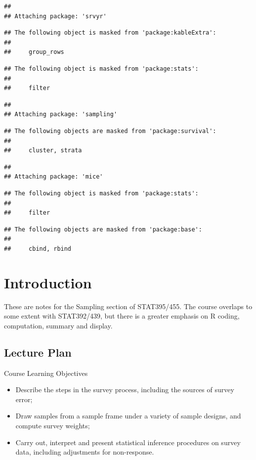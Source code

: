\documentclass[
]{book}
\providecommand{\tightlist}{%
  \setlength{\itemsep}{0pt}\setlength{\parskip}{0pt}}
\begin{document}
\begin{verbatim}
## 
## Attaching package: 'srvyr'
\end{verbatim}

\begin{verbatim}
## The following object is masked from 'package:kableExtra':
## 
##     group_rows
\end{verbatim}

\begin{verbatim}
## The following object is masked from 'package:stats':
## 
##     filter
\end{verbatim}

\begin{verbatim}
## 
## Attaching package: 'sampling'
\end{verbatim}

\begin{verbatim}
## The following objects are masked from 'package:survival':
## 
##     cluster, strata
\end{verbatim}

\begin{verbatim}
## 
## Attaching package: 'mice'
\end{verbatim}

\begin{verbatim}
## The following object is masked from 'package:stats':
## 
##     filter
\end{verbatim}

\begin{verbatim}
## The following objects are masked from 'package:base':
## 
##     cbind, rbind
\end{verbatim}

\chapter{Introduction}\label{introduction}

These are notes for the Sampling section of STAT395/455. The course
overlaps to some extent with STAT392/439, but there is a greater
emphasis on R coding, computation, summary and display.

\section{Lecture Plan}\label{lecture-plan}

Course Learning Objectives

\begin{itemize}
\tightlist
\item
  Describe the steps in the survey process, including the sources of survey error;
\item
  Draw samples from a sample frame under a variety of sample designs, and compute survey weights;
\item
  Carry out, interpret and present statistical inference procedures on survey data, including adjustments for non-response.
\end{itemize}
\end{document}
